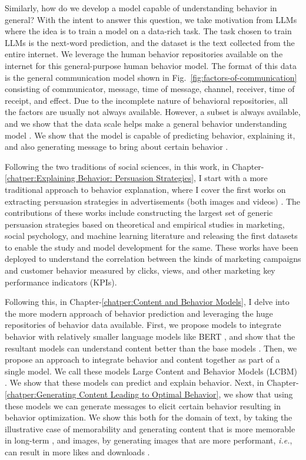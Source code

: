 \documentclass[hidelinks,11pt,a4paper]{report}
\renewcommand{\cite}[1]{\citep{#1}}
\begin{document}
Similarly, how do we develop a model capable of understanding behavior in general? With the intent to answer this question, we take motivation from LLMs where the idea is to train a model on a data-rich task. The task chosen to train LLMs is the next-word prediction, and the dataset is the text collected from the entire internet. We leverage the human behavior repositories available on the internet for this general-purpose human behavior model. The format of this data is the general communication model shown in Fig.~\ref{fig:factors-of-communication} consisting of communicator, message, time of message, channel, receiver, time of receipt, and effect. Due to the incomplete nature of behavioral repositories, all the factors are usually not always available. However, a subset is always available, and we show that the data scale helps make a general behavior understanding model \cite{khandelwal2023large}. We show that the model is capable of predicting behavior, explaining it, and also generating message to bring about certain behavior \cite{khurana2023behavior,si2023long,khandelwal2023large}.



Following the two traditions of social sciences, in this work, in Chapter-\ref{chatper:Explaining Behavior: Persuasion Strategies}, I start with a more traditional approach to behavior explanation, where I cover the first works on extracting persuasion strategies in advertisements (both images and videos) \cite{kumar2023persuasion,bhattacharyya-etal-2023-video}. The contributions of these works include constructing the largest set of generic persuasion strategies based on theoretical and empirical studies in marketing, social psychology, and machine learning literature and releasing the first datasets to enable the study and model development for the same. These works have been deployed to understand the correlation between the kinds of marketing campaigns and customer behavior measured by clicks, views, and other marketing key performance indicators (KPIs). 

Following this, in Chapter-\ref{chatper:Content and Behavior Models}, I delve into the more modern approach of behavior prediction and leveraging the huge repositories of behavior data available. First, we propose models to integrate behavior with relatively smaller language models like BERT \cite{devlin2018bert}, and show that the resultant models can understand content better than the base models \cite{khurana-etal-2023-synthesizing}. Then, we propose an approach to integrate behavior and content together as part of a single model. We call these models Large Content and Behavior Models (LCBM) \cite{khandelwal2023large}. We show that these models can predict and explain behavior. Next, in Chapter-\ref{chatper:Generating Content Leading to Optimal Behavior}, we show that using these models we can generate messages to elicit certain behavior resulting in behavior optimization. We show this both for the domain of text, by taking the illustrative case of memorability and generating content that is more memorable in long-term \cite{si2023long}, and images, by generating images that are more performant, \textit{i.e.}, can result in more likes and downloads \cite{khurana2023behavior}.
\end{document}
